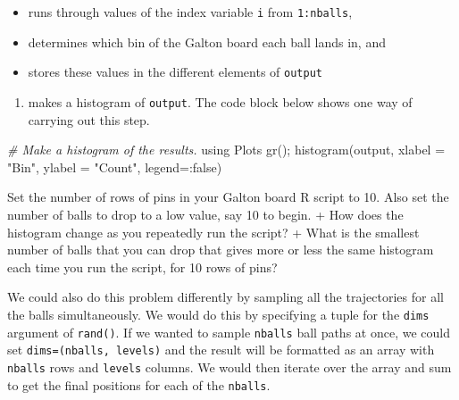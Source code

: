 \documentclass[
  11pt,
]{book}
\newenvironment{Shaded}{\begin{snugshade}}{\end{snugshade}}
\newcommand{\CommentTok}[1]{\textcolor[rgb]{0.37,0.37,0.37}{\textit{#1}}}
\newcommand{\NormalTok}[1]{#1}
\newcommand{\StringTok}[1]{\textcolor[rgb]{0.5,0.5,0.5}{#1}}
\providecommand{\tightlist}{%
  \setlength{\itemsep}{0pt}\setlength{\parskip}{0pt}}
\begin{document}
\begin{itemize}
\tightlist
\item
  runs through values of the index variable \texttt{i} from \texttt{1:nballs},
\item
  determines which bin of the Galton board each ball lands in, and
\item
  stores these values in the different elements of \texttt{output}
\end{itemize}

\begin{enumerate}
\def\labelenumi{\arabic{enumi}.}
\setcounter{enumi}{3}
\tightlist
\item
  makes a histogram of \texttt{output}. The code block below shows one way of carrying out this step.
\end{enumerate}

\begin{Shaded}
\begin{Highlighting}[]
\CommentTok{# Make a histogram of the results.}
\NormalTok{using Plots}
\NormalTok{gr();}
\NormalTok{histogram(output, xlabel = }\StringTok{"Bin"}\NormalTok{, ylabel = }\StringTok{"Count"}\NormalTok{, }
\NormalTok{  legend=:false)}
\end{Highlighting}
\end{Shaded}

Set the number of rows of pins in your Galton board R script to 10. Also set the number of balls to drop to a low value, say 10 to begin. + How does the histogram change as you repeatedly run the script? + What is the smallest number of balls that you can drop that gives more or less the same histogram each time you run the script, for 10 rows of pins?

\begin{center}

\begin{info}
We could also do this problem differently by sampling all the trajectories for all the balls simultaneously. We would do this by specifying a tuple for the \texttt{dims} argument of \texttt{rand()}. If we wanted to sample \texttt{nballs} ball paths at once, we could set \texttt{dims=(nballs,\ levels)} and the result will be formatted as an array with \texttt{nballs} rows and \texttt{levels} columns. We would then iterate over the array and sum to get the final positions for each of the \texttt{nballs}.

\end{info}


\end{center}
\end{document}
